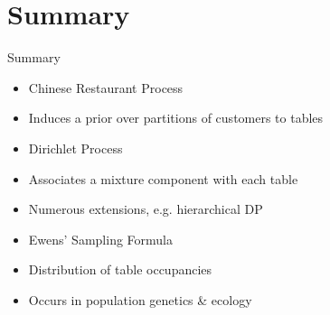 \documentclass{beamer}
\begin{document}
\section*{Summary}

\begin{frame}{Summary}

  \begin{itemize}
  \item Chinese Restaurant Process
   \itemb
   \item Induces a prior over partitions of customers to tables
   \iteme
  \item Dirichlet Process
   \itemb
   \item Associates a mixture component with each table
   \item Numerous extensions, e.g. hierarchical DP
   \iteme
  \item Ewens' Sampling Formula
   \itemb
   \item Distribution of table occupancies
   \item Occurs in population genetics \& ecology
   \iteme
  \end{itemize}

\end{frame}
\end{document}
